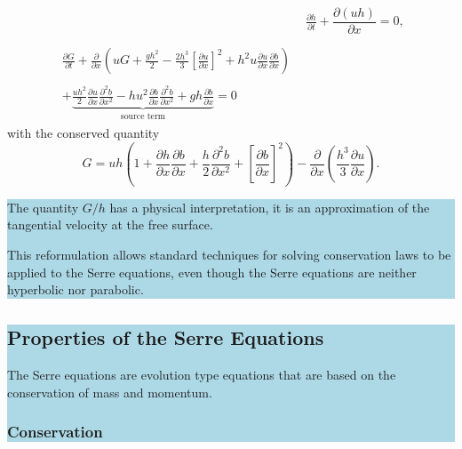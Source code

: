 \documentclass[times]{elsarticle}
\newcommand{\hlb}[1] {\par\colorbox{lightblue}{\parbox{\linewidth}{#1}}}
\newcommand{\hlb}[1] {{#1}}
\begin{document}
\begin{subequations}
	\label{eqn:FullSerreCon}
	\begin{align}
	& \frac{\partial h}{\partial t} + \dfrac{\partial (uh)}{\partial x} = 0 ,\label{eqn:FullSerreConMass}  \\ \nonumber \\
	\begin{split}
	\label{eqn:Serreconsconmom}
	\frac{\partial G}{\partial t}  + \frac{\partial}{\partial x} \left( {u} G + \frac{gh^2}{2} - \frac{2h^3}{3} \left[\frac{\partial {u}}{\partial x}\right]^2 + h^2 {u}\frac{\partial {u}}{\partial x}\frac{\partial b}{\partial x} \right) \\ \\ +  \underbrace{\frac{uh^2}{2} \frac{\partial {u}}{\partial x} \frac{\partial^2 b}{\partial x^2}  - h {u}^2\frac{\partial b}{\partial x}\frac{\partial^2 b}{\partial x^2} + gh\frac{\partial b}{\partial x} } _{\text{source term}} = 0
	\end{split}
	\end{align}
\end{subequations}
with the conserved quantity
\begin{equation}
\label{defn:SerreEqnConservedQuantity1}
G =  {u}h \left(1 + \frac{\partial h}{\partial x}\frac{\partial b}{\partial x} + \frac{h}{2}\frac{\partial^2 b}{\partial x^2} + \left[\frac{\partial b}{\partial x}\right]^2 \right) - \frac{\partial}{\partial x}\left(\frac{h^3}{3}  \frac{\partial {u}}{\partial x}\right).
\end{equation}
\hlb{The quantity $G/h$ has a physical interpretation, it is an approximation of the tangential velocity at the free surface.

This reformulation allows standard techniques for solving conservation laws to be applied to the Serre equations, even though the Serre equations are neither hyperbolic nor parabolic.
}
\hlb{
\subsection{Properties of the Serre Equations}
The Serre equations are evolution type equations that are based on the conservation of mass and momentum.
\subsubsection{Conservation}}
\end{document}
